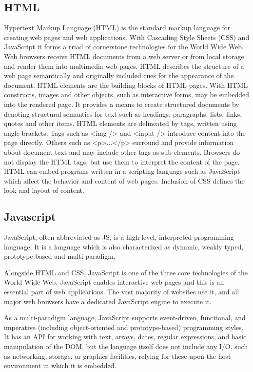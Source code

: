 \subsection{HTML}
Hypertext Markup Language (HTML) is the standard markup language for creating web pages and web applications. With Cascading Style Sheets (CSS) and JavaScript it forms a triad of cornerstone technologies for the World Wide Web. Web browsers receive HTML documents from a web server or from local storage and render them into multimedia web pages. HTML describes the structure of a web page semantically and originally included cues for the appearance of the document.
HTML elements are the building blocks of HTML pages. With HTML constructs, images and other objects, such as interactive forms, may be embedded into the rendered page. It provides a means to create structured documents by denoting structural semantics for text such as headings, paragraphs, lists, links, quotes and other items. HTML elements are delineated by tags, written using angle brackets. Tags such as <img /> and <input /> introduce content into the page directly. Others such as <p>...</p> surround and provide information about document text and may include other tags as sub-elements. Browsers do not display the HTML tags, but use them to interpret the content of the page.
HTML can embed programs written in a scripting language such as JavaScript which affect the behavior and content of web pages. Inclusion of CSS defines the look and layout of content. 

\subsection{Javascript}
JavaScript, often abbreviated as JS, is a high-level, interpreted programming language. It is a language which is also characterized as dynamic, weakly typed, prototype-based and multi-paradigm.

Alongside HTML and CSS, JavaScript is one of the three core technologies of the World Wide Web. JavaScript enables interactive web pages and this is an essential part of web applications. The vast majority of websites use it, and all major web browsers have a dedicated JavaScript engine to execute it.

As a multi-paradigm language, JavaScript supports event-driven, functional, and imperative (including object-oriented and prototype-based) programming styles. It has an API for working with text, arrays, dates, regular expressions, and basic manipulation of the DOM, but the language itself does not include any I/O, such as networking, storage, or graphics facilities, relying for these upon the host environment in which it is embedded.

